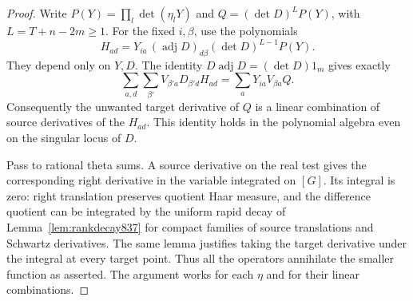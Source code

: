 \documentclass[a4paper,11pt]{article}
\theoremstyle{definition}
\theoremstyle{remark}
\numberwithin{equation}{section}
\begin{document}
\begin{proof}
Write \(P(Y)=\prod_l\det(\eta_lY)\) and
\(Q=(\det D)^L P(Y)\), with \(L=T+n-2m\ge1\).
For the fixed \(i,\beta\), use the polynomials
\[
       H_{ad}=Y_{ia}\,(\operatorname{adj}D)_{d\beta}
                            (\det D)^{L-1}P(Y).
\]
They depend only on \(Y,D\). The identity
\(D\operatorname{adj}D=(\det D)1_m\) gives exactly
\[
       \sum_{a,d}\sum_{\beta'} V_{\beta'a}D_{\beta'd}H_{ad}
                    =\sum_a Y_{ia} V_{\beta a}Q .
\]
Consequently the unwanted target derivative of \(Q\) is
a linear combination of source derivatives of the \(H_{ad}\).
This identity holds in the polynomial algebra even on the
singular locus of \(D\).

Pass to rational theta sums. A source derivative on the
real test gives the corresponding right derivative in the
variable integrated on \([G]\). Its integral is zero: right
translation preserves quotient Haar measure, and the
difference quotient can be integrated by the uniform rapid
decay of Lemma~\ref{lem:rankdecay837} for compact families
of source translations and Schwartz derivatives. The same
lemma justifies taking the target derivative under the
integral at every target point. Thus all the operators
annihilate the smaller function as asserted. The argument
works for each \(\eta\) and for their linear combinations.
\end{proof}
\end{document}
